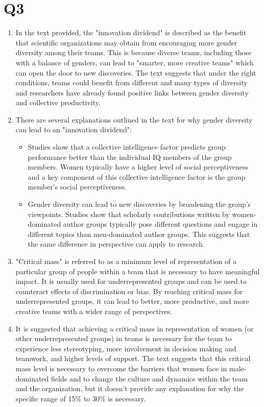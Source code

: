 \documentclass[12pt, letterpaper, titlepage]{article}
\begin{document}
\section*{Q3}
\begin{enumerate}
    \item In the text provided, the "innovation dividend" is described as the benefit that scientific organizations may obtain from encouraging more gender diversity among their teams. This is because diverse teams, including those with a balance of genders, can lead to "smarter, more creative teams" which can open the door to new discoveries. The text suggests that under the right conditions, teams could benefit from different and many types of diversity and researchers have already found positive links between gender diversity and collective productivity.
    \item There are several explanations outlined in the text for why gender diversity can lead to an "innovation dividend":
    \begin{itemize}
        \item Studies show that a collective intelligence factor predicts group performance better than the individual IQ members of the group members. Women typically have a higher level of social perceptiveness and a key component of this collective intelligence factor is the group member's social perceptiveness. 
        \item Gender diversity can lead to new discoveries by broadening the group's viewpoints. Studies show that scholarly contributions written by women-dominated author groups typically pose different questions and engage in different topics than men-dominated author groups. This suggests that the same difference in perspective can apply to research. 
    \end{itemize}
    \item "Critical mass" is referred to as a minimum level of representation of a particular group of people within a team that is necessary to have meaningful impact. It is usually used for underrepresented groups and can be used to counteract effects of discrimination or bias. By reaching critical mass for underrepresented groups, it can lead to better, more productive, and more creative teams with a wider range of perspectives.
    \item It is suggested that achieving a critical mass in representation of women (or other underrepresented groups) in teams is necessary for the team to experience less stereotyping, more involvement in decision making and teamwork, and higher levels of support. The text suggests that this critical mass level is necessary to overcome the barriers that women face in male-dominated fields and to change the culture and dynamics within the team and the organization, but it doesn't provide any explanation for why the specific range of 15\% to 30\% is necessary. 
\end{enumerate}
\end{document}
